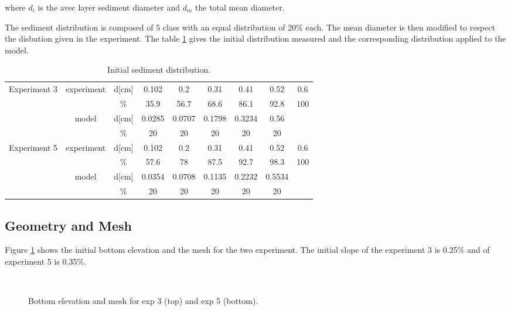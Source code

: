 where $d_i$ is the avec layer sediment diameter and $d_m$ the total mean diameter.

The sediment distribution is composed of 5 class with an equal distribution of 20\% each. The mean diameter is then modified to respect the disbution given in the experiment. The table \ref{guenter-t2d:tab:distrib} gives the initial distribution measured and the corresponding distribution applied to the model.

\begin{table}[h]
\centering
\begin{tabular}{|*{9}{c|}}
\hline
\multirow{4}{*}{Experiment 3} & \multirow{2}{*}{experiment} & d[cm] & 0.102 & 0.2 & 0.31 & 0.41 & 0.52 & 0.6 \\
 \cline{3-9}
 & & \% & 35.9 & 56.7 & 68.6 & 86.1 & 92.8 & 100 \\
 \cline{2-9}
 & \multirow{2}{*}{model} & d[cm] & 0.0285 & 0.0707 & 0.1798 & 0.3234 & 0.56 & \\
 \cline{3-9}
 & & \% & 20 & 20 & 20 & 20 & 20 & \\
\hline
\multirow{4}{*}{Experiment 5} & \multirow{2}{*}{experiment} & d[cm] & 0.102 & 0.2 & 0.31 & 0.41 & 0.52 & 0.6 \\
 \cline{3-9}
 & & \% & 57.6 & 78 & 87.5 & 92.7 & 98.3 & 100 \\
 \cline{2-9}
 & \multirow{2}{*}{model} & d[cm] & 0.0354 & 0.0708 & 0.1135 & 0.2232 & 0.5534 &\\
 \cline{3-9}
 & & \% & 20 & 20 & 20 & 20 & 20 & \\
\hline
\end{tabular}
\caption{Initial sediment distribution.}
\label{guenter-t2d:tab:distrib}
\end{table}

\subsection{Geometry and Mesh}
%
Figure \ref{guenter-t2d:fig:bottom} shows the initial bottom elevation and the mesh for the two experiment. The initial slope of the experiment 3 is 0.25\% and of experiment 5 is 0.35\%.

\begin{figure}[H]
 \centering
 \\
 \caption{Bottom elevation and mesh for exp 3 (top) and exp 5 (bottom).}
 \label{guenter-t2d:fig:bottom}
\end{figure}
%
